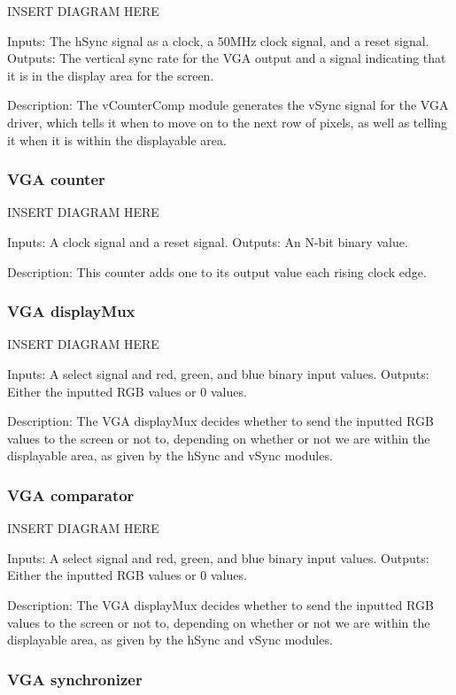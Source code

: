 \documentclass[a4paper]{article}
\begin{document}
INSERT DIAGRAM HERE

Inputs: The hSync signal as a clock, a 50MHz clock signal, and a reset signal.
Outputs: The vertical sync rate for the VGA output and a signal indicating that it is in the display area for the screen.

Description: The vCounterComp module generates the vSync signal for the VGA driver, which tells it when to move on to the next row of pixels, as well as telling it when it is within the displayable area.

\subsubsection{VGA counter}

INSERT DIAGRAM HERE

Inputs: A clock signal and a reset signal.
Outputs: An N-bit binary value.

Description: This counter adds one to its output value each rising clock edge.

\subsubsection{VGA displayMux}

INSERT DIAGRAM HERE

Inputs: A select signal and red, green, and blue binary input values.
Outputs: Either the inputted RGB values or 0 values.

Description: The VGA displayMux decides whether to send the inputted RGB values to the screen or not to, depending on whether or not we are within the displayable area, as given by the hSync and vSync modules.

\subsubsection{VGA comparator}

INSERT DIAGRAM HERE

Inputs: A select signal and red, green, and blue binary input values.
Outputs: Either the inputted RGB values or 0 values.

Description: The VGA displayMux decides whether to send the inputted RGB values to the screen or not to, depending on whether or not we are within the displayable area, as given by the hSync and vSync modules.

\subsubsection{VGA synchronizer}
\end{document}
